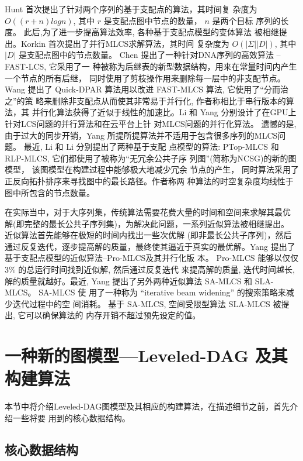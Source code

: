 Hunt \cite{Hunt1977} 首次提出了针对两个序列的基于支配点的算法，其时间复
杂度为 $O((r+n)logn)$, 其中 $r$ 是支配点图中节点的数量， $n$ 是两个目标
序列的长度。 此后,为了进一步提高算法效率, 各种基于支配点模型的变体算法
被相继提出。Korkin \cite{Korkin2001} 首次提出了并行MLCS求解算法，其时间
复杂度为 $O(|\Sigma||D|)$, 其中 $|D|$ 是支配点图中的节点数量。 Chen
\cite{Chen2006} 提出了一种针对DNA序列的高效算法 -- FAST-LCS, 它采用了一
种被称为后继表的新型数据结构，用来在常量时间内产生一个节点的所有后继，
同时使用了剪枝操作用来删除每一层中的非支配节点。 Wang \cite{Wang2011}
提出了 Quick-DPAR 算法用以改进 FAST-MLCS 算法, 它使用了“分而治之”的策
略来删除非支配点从而使其非常易于并行化, 作者称相比于串行版本的算法，其
并行化算法获得了近似于线性的加速比。Li \cite{Li2012} 和 Yang
\cite{Yang2010} 分别设计了在GPU上针对LCS问题的并行算法和在云平台上针
对MLCS问题的并行化算法。 遗憾的是, 由于过大的同步开销，Yang
\cite{Yang2010} 所提所提算法并不适用于包含很多序列的MLCS问题。 最近,
Li \cite{Li2016_ICDE} 和 Li \cite{Li2016_SIGKDD} 分别提出了两种基于支配
点模型的算法: PTop-MLCS 和 RLP-MLCS, 它们都使用了被称为“无冗余公共子序
列图”(简称为NCSG)的新的图模型， 该图模型在构建过程中能够极大地减少冗余
节点的产生， 同时算法采用了正反向拓扑排序来寻找图中的最长路径。作者称两
种算法的时空复杂度均线性于图中所包含的节点数量。

在实际当中，对于大序列集，传统算法需要花费大量的时间和空间来求解其最优
解(即完整的最长公共子序列集)，为解决此问题，一系列近似算法被相继提出。
近似算法首先能够在极短的时间内找出一些次优解 (即非最长公共子序列)，然后
通过反复迭代，逐步提高解的质量，最终使其逼近于真实的最优解。Yang
\cite{Yang2013} 提出了基于支配点模型的近似算法--Pro-MLCS及其并行化版
本。 Pro-MLCS 能够以仅仅 $3\%$ 的总运行时间找到近似解, 然后通过反复迭代
来提高解的质量, 迭代时间越长, 解的质量就越好。最近, Yang
\cite{Yang2014} 提出了另外两种近似算法 SA-MLCS 和 SLA-MLCS。 SA-MLCS 使
用了一种称为 “iterative beam widening” 的搜索策略来减少迭代过程中的空
间消耗。 基于 SA-MLCS, 空间受限型算法 SLA-MLCS 被提出, 它可以确保算法的
内存开销不超过预先设定的值。


\section{一种新的图模型---Leveled-DAG 及其构建算法}
\label{sec:Algorithm}

本节中将介绍Leveled-DAG图模型及其相应的构建算法，在描述细节之前，首先介绍一些将要
用到的核心数据结构。

\subsection{核心数据结构}
\label{sec:data structures}

